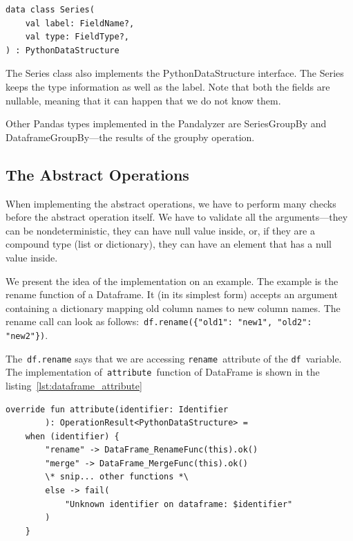 \begin{lstlisting}[caption=Kotlin definition of the Series, label={lst:series_definition}, captionpos=b]
data class Series(
    val label: FieldName?,
    val type: FieldType?,
) : PythonDataStructure
\end{lstlisting}

The Series class also implements the PythonDataStructure interface.
The Series keeps the type information as well as the label.
Note that both the fields are nullable, meaning that it can happen that we do not know them.

Other Pandas types implemented in the Pandalyzer are SeriesGroupBy and DataframeGroupBy---the results of the groupby
operation.

\subsection{The Abstract Operations}\label{subsec:the-abstract-operations}

When implementing the abstract operations, we have to perform many checks before the abstract operation itself.
We have to validate all the arguments---they can be nondeterministic, they can have null value inside, or, if they are
a compound type (list or dictionary), they can have an element that has a null value inside.

We present the idea of the implementation on an example.
The example is the rename function of a Dataframe.
It (in its simplest form) accepts an argument containing a dictionary mapping old column names to new column names.
The rename call can look as follows:~\verb|df.rename({"old1": "new1", "old2": "new2"})|.

The~\verb|df.rename| says that we are accessing \verb|rename|~attribute of the \verb|df|~variable.
The implementation of~\verb|attribute|~function of DataFrame is shown in the listing~\ref{lst:dataframe_attribute}

\begin{lstlisting}[caption=Snippet of attribute function of Dataframe, label={lst:dataframe_attribute}, captionpos=b]
override fun attribute(identifier: Identifier
        ): OperationResult<PythonDataStructure> =
    when (identifier) {
        "rename" -> DataFrame_RenameFunc(this).ok()
        "merge" -> DataFrame_MergeFunc(this).ok()
        \* snip... other functions *\
        else -> fail(
            "Unknown identifier on dataframe: $identifier"
        )
    }
\end{lstlisting}

